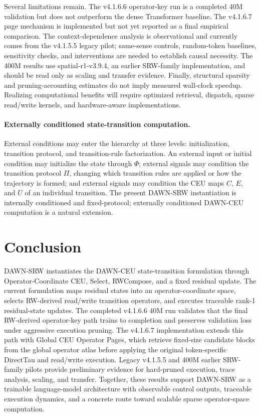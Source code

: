 \documentclass{article}
\begin{document}
Several limitations remain. The v4.1.6.6 operator-key run is a completed 40M validation but does not outperform the dense Transformer baseline. The v4.1.6.7 page mechanism is implemented but not yet reported as a final empirical comparison. The context-dependence analysis is observational and currently comes from the v4.1.5.5 legacy pilot; same-sense controls, random-token baselines, sensitivity checks, and interventions are needed to establish causal necessity. The 400M results use spatial-r1-v3.9.4, an earlier SRW-family implementation, and should be read only as scaling and transfer evidence. Finally, structural sparsity and pruning-accounting estimates do not imply measured wall-clock speedup. Realizing computational benefits will require optimized retrieval, dispatch, sparse read/write kernels, and hardware-aware implementations.

\paragraph{Externally conditioned state-transition computation.}
External conditions may enter the hierarchy at three levels: initialization, transition protocol, and transition-rule factorization. An external input or initial condition may initialize the state through \(\Phi\); external signals may condition the transition protocol \(\Pi\), changing which transition rules are applied or how the trajectory is formed; and external signals may condition the CEU maps \(C\), \(E\), and \(U\) of an individual transition. The present DAWN-SRW instantiation is internally conditioned and fixed-protocol; externally conditioned DAWN-CEU computation is a natural extension.

\section{Conclusion}

DAWN-SRW instantiates the DAWN-CEU state-transition formulation through Operator-Coordinate CEU, Select, RWCompose, and a fixed residual update. The current formulation maps residual states into an operator-coordinate space, selects RW-derived read/write transition operators, and executes traceable rank-1 residual-state updates. The completed v4.1.6.6 40M run validates that the final RW-derived operator-key path trains to completion and preserves validation loss under aggressive execution pruning. The v4.1.6.7 implementation extends this path with Global CEU Operator Pages, which retrieve fixed-size candidate blocks from the global operator atlas before applying the original token-specific DirectTau and read/write execution. Legacy v4.1.5.5 and 400M earlier SRW-family pilots provide preliminary evidence for hard-pruned execution, trace analysis, scaling, and transfer. Together, these results support DAWN-SRW as a trainable language-model architecture with observable control outputs, traceable execution dynamics, and a concrete route toward scalable sparse operator-space computation.
\end{document}
